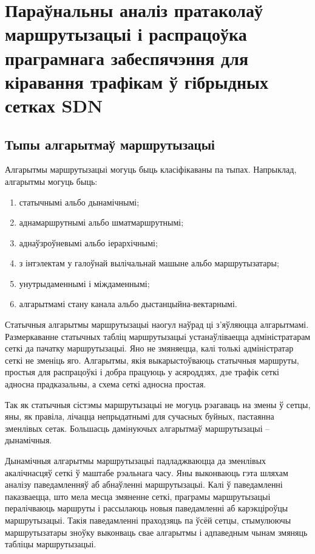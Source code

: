 \section{Параўнальны аналіз пратаколаў маршрутызацыі і распрацоўка праграмнага забеспячэння для кіравання трафікам ў гібрыдных сетках SDN}

\subsection{Тыпы алгарытмаў маршрутызацыі}

Алгарытмы маршрутызацыі могуць быць класіфікаваны па тыпах.
Напрыклад, алгарытмы могуць быць:
\begin{enumerate}
    \item статычнымі альбо дынамічнымі;
    \item аднамаршрутнымі альбо шматмаршрутнымі;
    \item аднаўзроўневымі альбо іерархічнымі;
    \item з інтэлектам у галоўнай вылічальнай машыне альбо маршрутызатары;
    \item унутрыдаменнымі і міждаменнымі;
    \item алгарытмамі стану канала альбо дыстанцыйна-вектарнымі.
\end{enumerate}

Статычныя алгарытмы маршрутызацыі наогул наўрад ці з'яўляюцца
алгарытмамі.
Размеркаванне статычных табліц маршрутызацыі
устанаўліваецца адміністратарам сеткі да пачатку маршрутызацыі. Яно не
змяняецца, калі толькі адміністратар сеткі не зменіць яго. Алгарытмы,
якія выкарыстоўваюць статычныя маршруты, простыя для распрацоўкі і добра
працуюць у асяроддзях, дзе трафік сеткі адносна прадказальны, а схема
сеткі адносна простая.

Так як статычныя сістэмы маршрутызацыі не могуць рэагаваць на
змены ў сетцы, яны, як правіла, лічацца непрыдатнымі для сучасных
буйных, пастаянна зменлівых сетак. Большасць дамінуючых
алгарытмаў маршрутызацыі -- дынамічныя.

Дынамічныя алгарытмы маршрутызацыі падладжваюцца да зменлівых акалічнасцяў сеткі ў маштабе рэальнага часу. Яны выконваюць гэта шляхам аналізу паведамленняў аб абнаўленні маршрутызацыі. Калі ў паведамленні паказваецца, што мела месца змяненне сеткі, праграмы маршрутызацыі пералічваюць маршруты і рассылаюць новыя паведамленні аб карэкціроўцы маршрутызацыі. Такія паведамленні праходзяць па ўсёй сетцы, стымулюючы маршрутызатары зноўку выконваць свае алгарытмы і адпаведным чынам змяняць табліцы маршрутызацыі.

